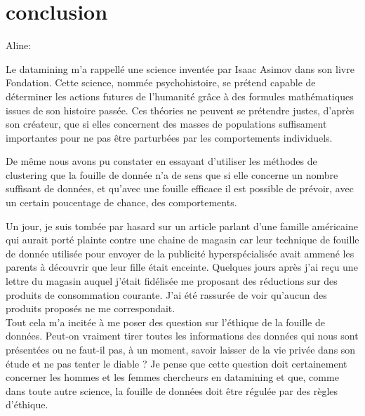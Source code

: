 \chapter{conclusion}

Aline: 

Le datamining m'a rappellé une science inventée par Isaac Asimov dans son livre Fondation. Cette science, nommée psychohistoire, se prétend capable de déterminer les actions futures de l'humanité grâce à des formules mathématiques issues de son histoire passée. Ces théories ne peuvent se prétendre justes, d'après son créateur, que si elles concernent des masses de populations suffisament importantes pour ne pas être parturbées par les comportements individuels. 

De même nous avons pu constater en essayant d'utiliser les méthodes de clustering que la fouille de donnée n'a de sens que si elle concerne un nombre suffisant de données, et qu'avec une fouille efficace il est possible de prévoir, avec un certain poucentage de chance, des comportements.

Un jour, je suis tombée par hasard sur un article parlant d'une famille américaine qui aurait porté plainte contre une chaine de magasin car leur technique de fouille de donnée utilisée pour envoyer de la publicité hyperspécialisée avait ammené les parents à découvrir que leur fille était enceinte. Quelques jours après j'ai reçu une lettre du magasin auquel j'était fidélisée me proposant des réductions sur des produits de consommation courante. J'ai été rassurée de voir qu'aucun des produits proposés ne me correspondait. 
\\

Tout cela m'a incitée à me poser des question sur l'éthique de la fouille de données. Peut-on vraiment tirer toutes les informations des données qui nous sont présentées ou ne faut-il pas, à un moment, savoir laisser de la vie privée dans son étude et ne pas tenter le diable ? Je pense que cette question doit certainement concerner les hommes et les femmes chercheurs en datamining et que, comme dans toute autre science, la fouille de données doit être régulée par des règles d'éthique.



